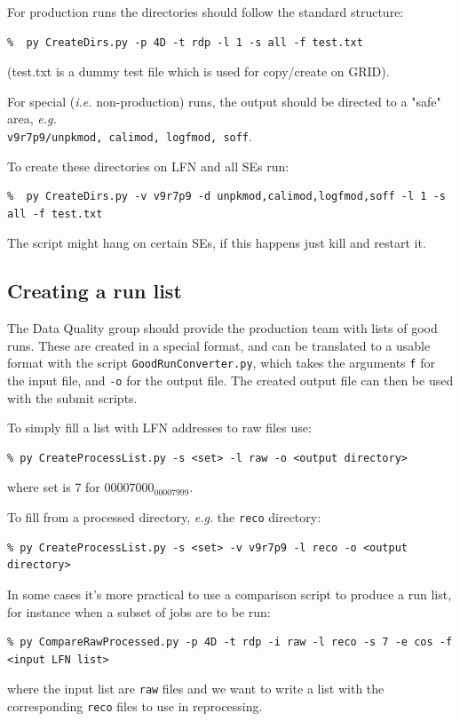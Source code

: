 \documentclass[11pt]{article}
\begin{document}
For production runs the directories should follow the standard structure:
\begin{verbatim}
%  py CreateDirs.py -p 4D -t rdp -l 1 -s all -f test.txt
\end{verbatim}
(test.txt is a dummy test file which is used for copy/create on GRID).

For special (\textit{i.e.} non-production) runs, the output should be directed to a "safe" area, \textit{e.g.}\\ \verb+v9r7p9/unpkmod, calimod, logfmod, soff+.

To create these directories on LFN and all SEs run:
\begin{verbatim}
%  py CreateDirs.py -v v9r7p9 -d unpkmod,calimod,logfmod,soff -l 1 -s all -f test.txt
\end{verbatim}

The script might hang on certain SEs, if this happens just kill and restart it.

\subsection{Creating a run list}

The Data Quality group should provide the production team with lists
of good runs. These are created in a special format, and can be
translated to a usable format with the script
\verb+GoodRunConverter.py+, which takes the arguments \verb+f+ for the
input file, and \verb+-o+ for the output file. The created output file
can then be used with the submit scripts. 

To simply fill a list with LFN addresses to raw files use:
\begin{verbatim}
% py CreateProcessList.py -s <set> -l raw -o <output directory>
\end{verbatim}
where set is 7 for $00007000_00007999$.

To fill from a processed directory, \textit{e.g.} the \verb+reco+ directory:
\begin{verbatim}
% py CreateProcessList.py -s <set> -v v9r7p9 -l reco -o <output directory>
\end{verbatim}

In some cases it's more practical to use a comparison script to produce a run list, for instance when a subset of jobs are to be run:
\begin{verbatim}
% py CompareRawProcessed.py -p 4D -t rdp -i raw -l reco -s 7 -e cos -f <input LFN list>
\end{verbatim}
where the input list are \verb+raw+ files and we want to write a list
with the corresponding \verb+reco+ files to use in reprocessing.
\end{document}
